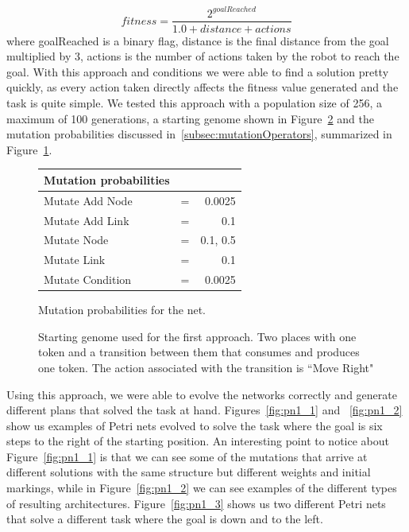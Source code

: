 \documentclass[12pt,a4paper,twocolumn]{article}
\begin{document}
\begin{equation}
fitness = \frac{2^{goalReached}}{1.0 + distance + actions}\label{eq:fitnessFunction}
\end{equation}
 where goalReached is a binary flag, distance is the final distance from the goal multiplied by 3, actions is the number of actions taken by the robot to reach the goal.
 With this approach and conditions we were able to find a solution pretty quickly, as every action taken directly affects the fitness value generated and the task is quite simple. We tested this approach with a population size of 256, a maximum of 100 generations, a starting genome shown in Figure~\ref{fig:genome} and the mutation probabilities discussed in~\ref{subsec:mutationOperators}, summarized in Figure~\ref{tab:probabilities}. 

\begin{figure} [b]
\centering
\begin{tabular}{|l c r|}
\hline
Mutation probabilities & & \\ \hline
Mutate Add Node & = & 0.0025 \\
Mutate Add Link & = & 0.1 \\
Mutate Node & = & 0.1, 0.5 \\
Mutate Link & = & 0.1 \\
Mutate Condition & = & 0.0025 \\
\hline
\end{tabular}
\caption{Mutation probabilities for the net.}
\label{tab:probabilities}
\end{figure}

\begin{figure} [h]
\centering
\caption{Starting genome used for the first approach. Two places with one token and a transition between them that consumes and produces one token. The action associated with the transition is ``Move Right"}
\label{fig:genome}
\end{figure}

Using this approach, we were able to evolve the networks correctly and generate different plans that solved the task at hand. Figures~\ref{fig:pn1_1} and ~\ref{fig:pn1_2} show us examples of Petri nets evolved to solve the task where the goal is six steps to the right of the starting position. An interesting point to notice about Figure~\ref{fig:pn1_1} is that we can see some of the mutations that arrive at different solutions with the same structure but different weights and initial markings, while in Figure~\ref{fig:pn1_2} we can see examples of the different types of resulting architectures. Figure~\ref{fig:pn1_3} shows us two different Petri nets that solve a different task where the goal is down and to the left. 
\end{document}
